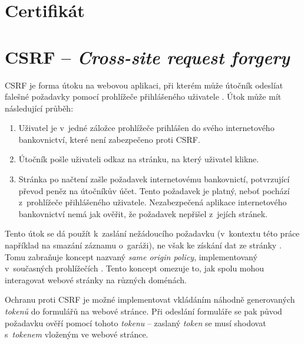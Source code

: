 

\section{Certifikát}



\section{CSRF -- \textit{Cross-site request forgery}}

CSRF je forma útoku na webovou aplikaci, při kterém může útočník odeslíat falešné požadavky pomocí prohlížeče přihlášeného uživatele \cite{csrf_owasp}. Útok může mít následující průběh:

\begin{enumerate}
    \item Uživatel je v~jedné záložce prohlížeče prihlášen do svého internetového bankovnictví, které není zabezpečeno proti CSRF.
    \item Útočník pošle uživateli odkaz na stránku, na který uživatel klikne.
    \item Stránka po načtení zašle požadavek internetovému bankovnictí, potvrzující převod peněz na útočníkův účet. Tento požadavek je platný, neboť pochází z~prohlížeče přihlášeného uživatele. Nezabezpečená aplikace internetového bankovnictví nemá jak ověřit, že požadavek nepřišel z~jejích stránek.
\end{enumerate}

Tento útok se dá použít k~zaslání nežádoucího požadavku (v~kontextu této práce například na smazání záznamu o~garáži), ne však ke získání dat ze stránky \cite{csrf_owasp}. Tomu zabraňuje koncept nazvaný \textit{same origin policy}, implementovaný v~současných prohlížečích \cite{sec_handbook}. Tento koncept omezuje to, jak spolu mohou interagovat webové stránky na různých doménách.

Ochranu proti CSRF je možné implementovat vkládáním náhodně generovaných \textit{tokenů} do formulářů na webové stránce. Při odeslání formuláře se pak původ požadavku ověří pomocí tohoto \textit{tokenu} -- zaslaný \textit{token} se musí shodovat s~\textit{tokenem} vloženým ve webové stránce.

